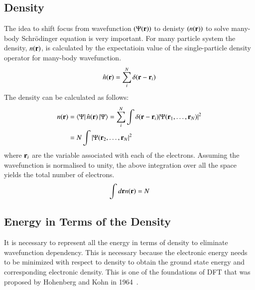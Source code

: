 \subsection{Density}
The idea to shift focus from wavefunction $(\Psi(\vb{r}))$ to denisty $(n(\vb{r}))$ to solve many-body Schr\"odinger equation is very important. For many particle system the density, $n(\vb{r})$, is calculated by the expectatioin value of the single-particle density operator for many-body wavefunction.
\begin{equation}
\hat{n}(\vb{r}) = \sum_i^N \delta(\vb{r} - \vb{r}_i)
\end{equation}
The density can be calculated as follows:
\begin{align}\label{deneqn}
\begin{split}
n(\vb{r}) & = \bra{\Psi}\hat{n}(\vb{r})\ket{\Psi} = \sum_i^N \int \delta(\vb{r}- \vb{r}_i) \abs{\Psi(\vb{r}_1,\dots,\vb{r}_N)}^2\\
    & = N \int \abs{\Psi(\vb{r}_2,\dots,\vb{r}_N}^2
\end{split}
\end{align}
where $\vb{r}_i$ are the variable associated with each of the electrons. Assuming the wavefunction is normalised to unity, the above integration over all the space yields the total number of electrons.
\begin{equation}
	\int d\vb{r} n(\vb{r}) = N
\end{equation} 


\subsection{Energy in Terms of the Density}
It is necessary to represent all the energy in terms of density to eliminate wavefunction dependency. This is necessary because the electronic energy needs to be minimized with respect to density to obtain the ground state energy and corresponding electronic density. This is one of the foundations of DFT that was proposed by Hohenberg and Kohn in 1964~\cite{hohenberg1964inhomogeneous}.

